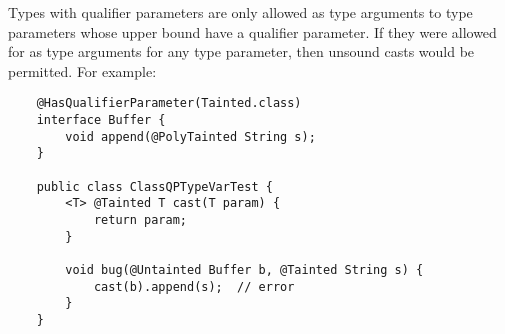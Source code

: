 Types with qualifier parameters are only allowed as type arguments to type parameters whose upper bound
have a qualifier parameter. If they were allowed for as type arguments for any type parameter, then
unsound casts would be permitted. For example:

\begin{Verbatim}
    @HasQualifierParameter(Tainted.class)
    interface Buffer {
        void append(@PolyTainted String s);
    }

    public class ClassQPTypeVarTest {
        <T> @Tainted T cast(T param) {
            return param;
        }

        void bug(@Untainted Buffer b, @Tainted String s) {
            cast(b).append(s);  // error
        }
    }


\end{Verbatim}

